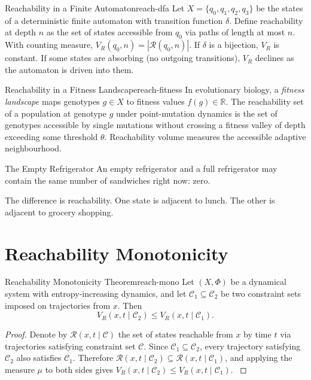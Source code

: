 \documentclass[12pt,twoside,openright]{book}
\newcommand{\csicon} {\marginpar{\tiny\color{DistBlue}\faCode}}
\newcommand{\bioicon}{\marginpar{\tiny\color{DistTeal}\faDna}}
\newcommand{\reach}{\mathcal{R}}
\begin{document}
\begin{example}{Reachability in a Finite Automaton}{reach-dfa}
  \csicon
  Let $X = \{q_0,q_1,q_2,q_3\}$ be the states of a
  deterministic finite automaton with transition function
  $\delta$. Define reachability at depth $n$ as the set of
  states accessible from $q_0$ via paths of length at most
  $n$. With counting measure, $V_R(q_0,n) = |\reach(q_0,n)|$.
  If $\delta$ is a bijection, $V_R$ is constant. If some
  states are absorbing (no outgoing transitions), $V_R$
  declines as the automaton is driven into them.
\end{example}

\begin{example}{Reachability in a Fitness Landscape}{reach-fitness}
  \bioicon
  In evolutionary biology, a \emph{fitness landscape} maps
  genotypes $g\in X$ to fitness values $f(g)\in\mathbb{R}$.
  The reachability set of a population at genotype $g$
  under point-mutation dynamics is the set of genotypes
  accessible by single mutations without crossing a fitness
  valley of depth exceeding some threshold $\theta$.
  Reachability volume measures the accessible adaptive
  neighbourhood.
\end{example}

\begin{distinctionaside}{The Empty Refrigerator}
An empty refrigerator and a full refrigerator may contain
the same number of sandwiches right now: zero.

The difference is reachability. One state is adjacent to
lunch. The other is adjacent to grocery shopping.
\end{distinctionaside}

\section{Reachability Monotonicity}
\label{sec:ch13-monotone}

\begin{theorem}{Reachability Monotonicity Theorem}{reach-mono}
  Let $(X,\Phi)$ be a dynamical system with
  entropy-increasing dynamics, and let
  $\mathcal{C}_1\subseteq\mathcal{C}_2$ be two constraint
  sets imposed on trajectories from $x$. Then
  \[
    V_R(x,t\mid\mathcal{C}_2) \le V_R(x,t\mid\mathcal{C}_1).
  \]
\end{theorem}

\begin{proof}
  Denote by $\reach(x,t\mid\mathcal{C})$ the set of states
  reachable from $x$ by time $t$ via trajectories satisfying
  constraint set $\mathcal{C}$. Since
  $\mathcal{C}_1\subseteq\mathcal{C}_2$, every trajectory
  satisfying $\mathcal{C}_2$ also satisfies $\mathcal{C}_1$.
  Therefore
  $\reach(x,t\mid\mathcal{C}_2) \subseteq \reach(x,t\mid\mathcal{C}_1)$,
  and applying the measure $\mu$ to both sides gives
  $V_R(x,t\mid\mathcal{C}_2) \le V_R(x,t\mid\mathcal{C}_1)$.
  \parencite{sontag1998}
\end{proof}
\end{document}
